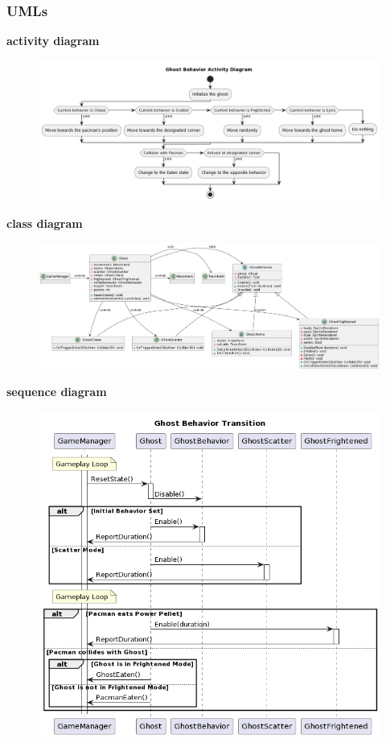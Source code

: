 \documentclass[11pt]{article}
\begin{document}
\subsubsection{UMLs}
\textbf{activity diagram}\\
\begin{figure}[H]
    \centering
    \includegraphics*[scale=0.3]{Ghost_Activity.png}
\end{figure}
\textbf{class diagram}\\
\begin{figure}[H]
    \centering
    \includegraphics*[scale=0.25]{Ghost_Class.png}
\end{figure}
\textbf{sequence diagram}\\
\begin{figure}[H]
    \centering
    \includegraphics*[scale=0.4]{Ghost_Sequence.png}
\end{figure}
\end{document}
